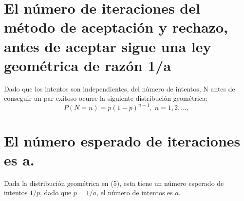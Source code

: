 \documentclass[letter, 10pt]{article}
\begin{document}
\section{El n\'umero de iteraciones del m\'etodo de aceptaci\'on y rechazo, antes de aceptar sigue una ley geom\'etrica de raz\'on 1/a}
Dado que los intentos son independientes, del n\'umero de intentos, N antes de conseguir un par exitoso ocurre la siguiente distribuci\'on geom\'etrica:
\begin{equation}
P(N=n)=p(1-p)^{n-1}, \; n=1,2,...,
\end{equation}

\section{El n\'umero esperado de iteraciones es a.}
Dada la distribuci\'on geom\'etrica en (5), esta tiene un n\'umero esperado de intentos $1/p$, dado que $p=1/a$, el n\'umero de intentos es $a$.
\end{document}
